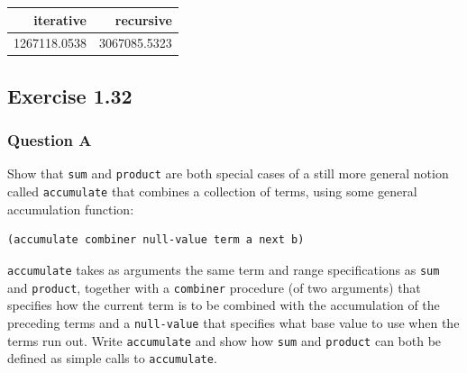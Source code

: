 \documentclass[final,fleqn,titlepage,twoside]{article}
\begin{document}
\begin{center}
\begin{tabular}{rr}
iterative & recursive\\[0pt]
\hline
1267118.0538 & 3067085.5323\\[0pt]
\end{tabular}
\end{center}

\subsection{Exercise 1.32}
\label{sec:org80e6a06}
\subsubsection{Question A}
\label{sec:org00f3e80}
Show that \texttt{sum} and \texttt{product} are both special cases of a
still more general notion called \texttt{accumulate} that combines a
collection of terms, using some general accumulation function:

\begin{verbatim}
(accumulate combiner null-value term a next b)
\end{verbatim}

\texttt{accumulate} takes as arguments the same term and range specifications
as \texttt{sum} and \texttt{product}, together with a \texttt{combiner}
procedure (of two arguments) that specifies how the current term is to be
combined with the accumulation of the preceding terms and a
\texttt{null-value} that specifies what base value to use when the terms run
out. Write \texttt{accumulate} and show how \texttt{sum} and
\texttt{product} can both be defined as simple calls to
\texttt{accumulate}.
\end{document}
